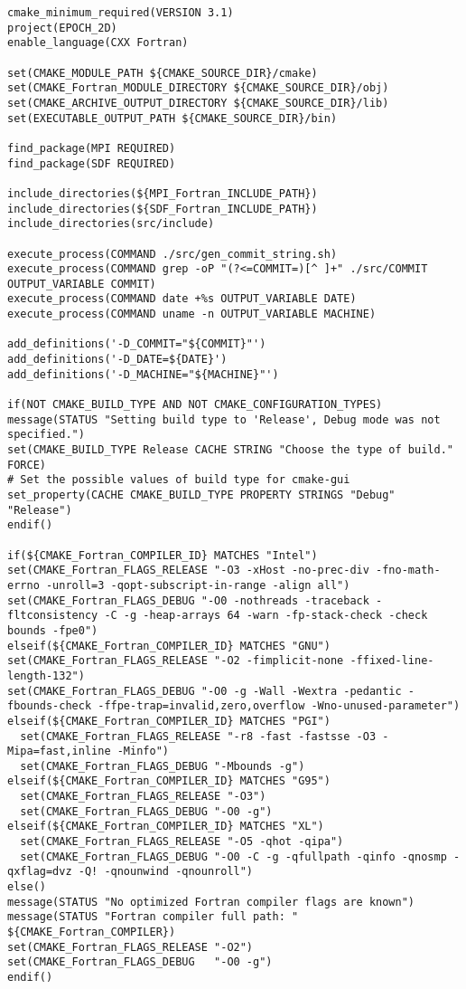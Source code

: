 \begin{lstlisting}[style=FORTRAN, caption=CMakeLists]
cmake_minimum_required(VERSION 3.1)
project(EPOCH_2D)
enable_language(CXX Fortran)

set(CMAKE_MODULE_PATH ${CMAKE_SOURCE_DIR}/cmake)
set(CMAKE_Fortran_MODULE_DIRECTORY ${CMAKE_SOURCE_DIR}/obj)
set(CMAKE_ARCHIVE_OUTPUT_DIRECTORY ${CMAKE_SOURCE_DIR}/lib)
set(EXECUTABLE_OUTPUT_PATH ${CMAKE_SOURCE_DIR}/bin)

find_package(MPI REQUIRED)
find_package(SDF REQUIRED)

include_directories(${MPI_Fortran_INCLUDE_PATH})
include_directories(${SDF_Fortran_INCLUDE_PATH})
include_directories(src/include)

execute_process(COMMAND ./src/gen_commit_string.sh)
execute_process(COMMAND grep -oP "(?<=COMMIT=)[^ ]+" ./src/COMMIT OUTPUT_VARIABLE COMMIT)
execute_process(COMMAND date +%s OUTPUT_VARIABLE DATE)
execute_process(COMMAND uname -n OUTPUT_VARIABLE MACHINE)

add_definitions('-D_COMMIT="${COMMIT}"')
add_definitions('-D_DATE=${DATE}')
add_definitions('-D_MACHINE="${MACHINE}"')

if(NOT CMAKE_BUILD_TYPE AND NOT CMAKE_CONFIGURATION_TYPES)
message(STATUS "Setting build type to 'Release', Debug mode was not specified.")
set(CMAKE_BUILD_TYPE Release CACHE STRING "Choose the type of build." FORCE)
# Set the possible values of build type for cmake-gui
set_property(CACHE CMAKE_BUILD_TYPE PROPERTY STRINGS "Debug" "Release")
endif()

if(${CMAKE_Fortran_COMPILER_ID} MATCHES "Intel")
set(CMAKE_Fortran_FLAGS_RELEASE "-O3 -xHost -no-prec-div -fno-math-errno -unroll=3 -qopt-subscript-in-range -align all")
set(CMAKE_Fortran_FLAGS_DEBUG "-O0 -nothreads -traceback -fltconsistency -C -g -heap-arrays 64 -warn -fp-stack-check -check bounds -fpe0")
elseif(${CMAKE_Fortran_COMPILER_ID} MATCHES "GNU")
set(CMAKE_Fortran_FLAGS_RELEASE "-O2 -fimplicit-none -ffixed-line-length-132")
set(CMAKE_Fortran_FLAGS_DEBUG "-O0 -g -Wall -Wextra -pedantic -fbounds-check -ffpe-trap=invalid,zero,overflow -Wno-unused-parameter")
elseif(${CMAKE_Fortran_COMPILER_ID} MATCHES "PGI")
  set(CMAKE_Fortran_FLAGS_RELEASE "-r8 -fast -fastsse -O3 -Mipa=fast,inline -Minfo")
  set(CMAKE_Fortran_FLAGS_DEBUG "-Mbounds -g")
elseif(${CMAKE_Fortran_COMPILER_ID} MATCHES "G95")
  set(CMAKE_Fortran_FLAGS_RELEASE "-O3")
  set(CMAKE_Fortran_FLAGS_DEBUG "-O0 -g")
elseif(${CMAKE_Fortran_COMPILER_ID} MATCHES "XL")
  set(CMAKE_Fortran_FLAGS_RELEASE "-O5 -qhot -qipa")
  set(CMAKE_Fortran_FLAGS_DEBUG "-O0 -C -g -qfullpath -qinfo -qnosmp -qxflag=dvz -Q! -qnounwind -qnounroll")
else()
message(STATUS "No optimized Fortran compiler flags are known")
message(STATUS "Fortran compiler full path: " ${CMAKE_Fortran_COMPILER})
set(CMAKE_Fortran_FLAGS_RELEASE "-O2")
set(CMAKE_Fortran_FLAGS_DEBUG   "-O0 -g")
endif()


\end{lstlisting}
